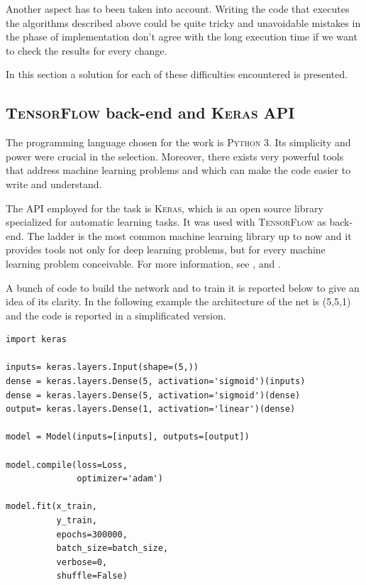 Another aspect has to been taken into account. Writing the code that executes the algorithms described above could be quite tricky and unavoidable mistakes in the phase of implementation don't agree with the long execution time if we want to check the results for every change.

In this section a solution for each of these difficulties encountered is presented.



\subsection{\textsc{TensorFlow} back-end and \textsc{Keras} API}
The programming language chosen for the work is \textsc{Python 3}. Its simplicity and power were crucial in the selection. Moreover, there exists very powerful tools that address machine learning problems and which can make the code easier to write and understand.

The API employed for the task is \textsc{Keras}, which is an open source library specialized for automatic learning tasks. It was used with \textsc{TensorFlow} as back-end. The ladder is the most common machine learning library up to now and it provides tools not only for deep learning problems, but for every machine learning problem conceivable. For more information, see \cite{python}, \cite{keras} and \cite{tensorflow}.

A bunch of code to build the network and to train it is reported below to give an idea of its clarity. In the following example the architecture of the net is (5,5,1) and the code is reported in a simplificated version.

\begin{lstlisting}[frame=single]
import keras

inputs= keras.layers.Input(shape=(5,))
dense = keras.layers.Dense(5, activation='sigmoid')(inputs)
dense = keras.layers.Dense(5, activation='sigmoid')(dense)
output= keras.layers.Dense(1, activation='linear')(dense)

model = Model(inputs=[inputs], outputs=[output])

model.compile(loss=Loss,
              optimizer='adam')

model.fit(x_train, 
          y_train,
          epochs=300000,
          batch_size=batch_size,
          verbose=0,
          shuffle=False)
\end{lstlisting}



